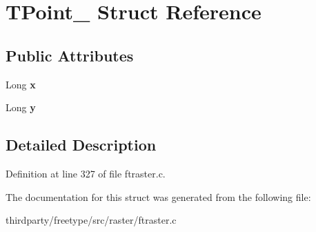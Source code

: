 \hypertarget{struct_t_point__}{}\section{T\+Point\+\_\+ Struct Reference}
\label{struct_t_point__}
\subsection*{Public Attributes}
\begin{DoxyCompactItemize}
\item 
\mbox{\label{struct_t_point___ad454f4acc4325ab64bd3f9763226f4c7}} 
Long {\bfseries x}
\item 
\mbox{\label{struct_t_point___a3baa22682a2412867ee411b5528f9086}} 
Long {\bfseries y}
\end{DoxyCompactItemize}


\subsection{Detailed Description}


Definition at line 327 of file ftraster.\+c.



The documentation for this struct was generated from the following file\+:\begin{DoxyCompactItemize}
\item 
thirdparty/freetype/src/raster/ftraster.\+c\end{DoxyCompactItemize}
